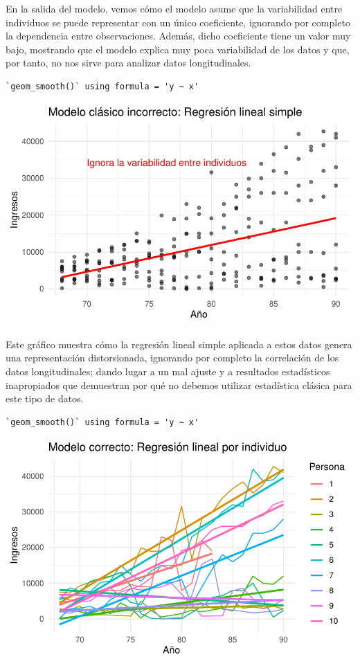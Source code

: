 \documentclass[
  letterpaper,
  DIV=11,
  numbers=noendperiod]{scrreprt}
\begin{document}
En la salida del modelo, vemos cómo el modelo asume que la variabilidad
entre individuos se puede representar con un único coeficiente,
ignorando por completo la dependencia entre observaciones. Además, dicho
coeficiente tiene un valor muy bajo, mostrando que el modelo explica muy
poca variabilidad de los datos y que, por tanto, no nos sirve para
analizar datos longitudinales.

\begin{verbatim}
`geom_smooth()` using formula = 'y ~ x'
\end{verbatim}

\includegraphics{cap2_files/figure-pdf/unnamed-chunk-3-1.pdf}

Este gráfico muestra cómo la regresión lineal simple aplicada a estos
datos genera una representación distorsionada, ignorando por completo la
correlación de los datos longitudinales; dando lugar a un mal ajuste y a
resultados estadísticos inapropiados que demuestran por qué no debemos
utilizar estadística clásica para este tipo de datos.

\begin{verbatim}
`geom_smooth()` using formula = 'y ~ x'
\end{verbatim}

\includegraphics{cap2_files/figure-pdf/unnamed-chunk-4-1.pdf}
\end{document}
